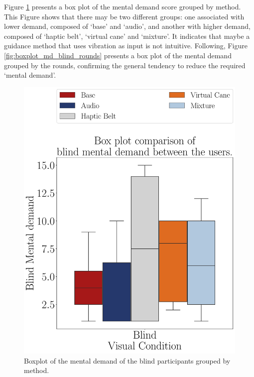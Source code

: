 Figure \ref{fig:boxplot_md_blind_scene}  presents a box plot of the mental demand score grouped by method. This Figure shows that there may be two different groups: one associated with lower demand, composed of ‘base’ and ‘audio’, and another with higher demand, composed of ‘haptic belt’, ‘virtual cane’ and ‘mixture’. It indicates that maybe a guidance method that uses vibration as input is not intuitive. Following, Figure \ref{fig:boxplot_md_blind_rounds} presents a box plot of the mental demand grouped by the rounds, confirming the general tendency to reduce the required ‘mental demand’. 

\begin{figure}[!htb]
    \centering
    \begin{minipage}{0.45\textwidth}
        \centering
        \includegraphics[width = 0.8\linewidth]{Resultados/Nasa/Figuras/pdf/boxplot_md_blind_scene.pdf}
        \caption{Boxplot of the mental demand of the blind participants grouped by method.}
        \label{fig:boxplot_md_blind_scene}
    \end{minipage}
    \begin{minipage}{0.075\textwidth}
        \hfill
    \end{minipage}
    \begin{minipage}{0.45\textwidth}
        \centering

\end{minipage}
\end{figure}
